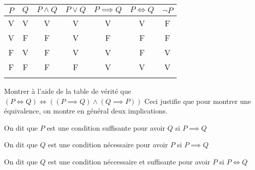 \begin{center}
    \begin{tabular}{!{\color{black}\vrule}c!{\color{black}\vrule}c!{\color{black}\vrule}c|c|c|c|c!{\color{black}\vrule}} 
    \hline
    $P$ & $Q$ & $P \land Q $ & $P \vee Q$ & $P \implies Q$ & $P \iff Q$ & $\lnot P$  \\ 
    \hline
    V   & V   & V            & V          & V              & V          & F          \\ 
    \hline
    V   & F   & F            & V          & F              & F          & F          \\ 
    \hline
    F   & V   & F            & V          & V              & F          & V          \\ 
    \hline
    F   & F   & F            & F          & V              & V          & V          \\
    \hline
    \end{tabular}
\end{center}
\begin{exo}
    Montrer à l'aide de la table de vérité que $(P\iff Q)\iff((P\implies Q)\land(Q\implies P))$
    Ceci justifie que pour montrer une équivalence, on montre en général deux implications.
\end{exo}
\begin{defini}
    On dit que $P$ est une condition suffisante pour avoir $Q$ si $P\implies Q$

    On dit que $Q$ est une condition nécessaire pour avoir $P$ si $P\implies Q$

    On dit que $Q$ est une condition néccessaire et suffisante pour avoir $P$ si $P\iff Q$
\end{defini}